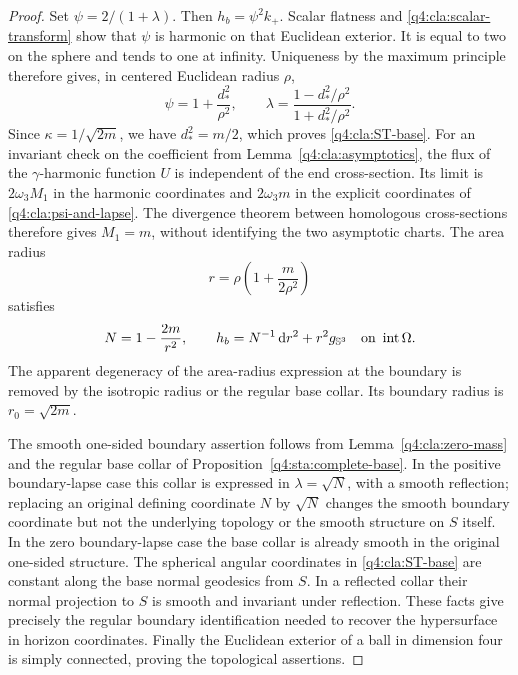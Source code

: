 \begin{proof}
Set $\psi=2/(1+\lambda)$.  Then $h_b=\psi^2k_+$.
Scalar flatness and \eqref{q4:cla:scalar-transform} show that $\psi$
is harmonic on that Euclidean exterior.  It is equal to two on
the sphere and tends to one at infinity.  Uniqueness by the
maximum principle therefore gives, in centered Euclidean radius
$\rho$,
\begin{equation}\label{q4:cla:psi-and-lapse}
 \psi=1+\frac{d_*^2}{\rho^2},\qquad
 \lambda=\frac{1-d_*^2/\rho^2}{1+d_*^2/\rho^2}.
\end{equation}
Since $\kappa=1/\sqrt{2m}$, we have $d_*^2=m/2$,
which proves \eqref{q4:cla:ST-base}.  For an invariant check on the
coefficient from Lemma~\ref{q4:cla:asymptotics}, the flux of the
$\gamma$-harmonic function $U$ is independent of the end cross-section.
Its limit is $2\omega_3M_1$ in the harmonic coordinates and
$2\omega_3m$ in the explicit coordinates of \eqref{q4:cla:psi-and-lapse}.
The divergence theorem between homologous cross-sections therefore
gives $M_1=m$, without identifying the two asymptotic charts.
The area radius
\[
 r=\rho\left(1+\frac{m}{2\rho^2}\right)
\]
satisfies
\begin{equation}\label{q4:cla:area-radius-base}
 N=1-\frac{2m}{r^2},\qquad
 h_b=N^{-1}\,\mathrm d r^2+r^2g_{\mathbb S^3}
       \quad\hbox{on }\operatorname{int}\Omega.
\end{equation}
The apparent degeneracy of the area-radius expression at the
boundary is removed by the isotropic radius or the regular base
collar.  Its boundary radius is $r_0=\sqrt{2m}$.

The smooth one-sided boundary assertion follows from
Lemma~\ref{q4:cla:zero-mass} and the regular base collar of
Proposition~\ref{q4:sta:complete-base}.  In the positive boundary-lapse
case this collar is expressed in $\lambda=\sqrt N$, with a smooth
reflection; replacing an original defining coordinate $N$ by
$\sqrt N$ changes the smooth boundary coordinate but not the
underlying topology or the smooth structure on $S$ itself.
In the zero boundary-lapse case the base collar is already smooth
in the original one-sided structure.  The spherical angular
coordinates in \eqref{q4:cla:ST-base} are constant along the base
normal geodesics from $S$.  In a reflected collar their normal
projection to $S$ is smooth and invariant under reflection.
These facts give precisely the regular boundary identification
needed to recover the hypersurface in horizon coordinates.
Finally the Euclidean exterior of a ball in dimension four is
simply connected, proving the topological assertions.
\end{proof}
